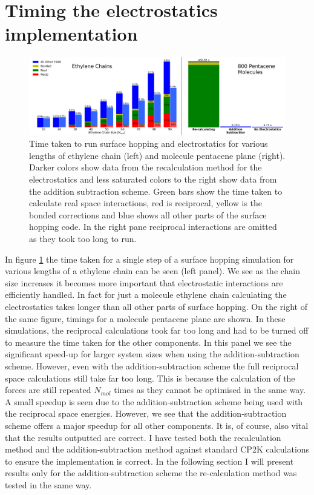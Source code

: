 \section{Timing the electrostatics implementation}
\begin{figure}[ht]
  \includegraphics[width=\textwidth]{../img/ES/TimingsReCalc_vs_AddSub.png}
	\caption{\label{fig:AddSubTimings}Time taken to run surface hopping and electrostatics for various lengths of  ethylene chain (left) and  molecule pentacene plane (right). Darker colors show data from the recalculation method for the electrostatics and less saturated colors to the right show data from the addition subtraction scheme. Green bars show the time taken to calculate real space interactions, red is reciprocal, yellow is the bonded corrections and blue shows all other parts of the surface hopping code. In the right pane reciprocal interactions are omitted as they took too long to run.}
\end{figure}
\noindent In figure \ref{fig:AddSubTimings} the time taken for a single step of a surface hopping simulation for various lengths of a  ethylene chain can be seen (left panel). We see as the chain size increases it becomes more important that electrostatic interactions are efficiently handled. In fact for just a  molecule ethylene chain calculating the electrostatics takes longer than all other parts of surface hopping. On the right of the same figure, timings for a  molecule pentacene plane are shown. In these simulations, the reciprocal calculations took far too long and had to be turned off to measure the time taken for the other components. In this panel we see the significant speed-up for larger system sizes when using the addition-subtraction scheme. However, even with the addition-subtraction scheme the full reciprocal space calculations still take far too long. This is because the calculation of the forces are still repeated $N_{mol}$ times as they cannot be optimised in the same way. A small speedup is seen due to the addition-subtraction scheme being used with the reciprocal space energies. However, we see that the addition-subtraction scheme offers a major speedup for all other components. It is, of course, also vital that the results outputted are correct. I have tested both the recalculation method and the addition-subtraction method against standard CP2K calculations to ensure the implementation is correct. In the following section I will present results only for the addition-subtraction scheme the re-calculation method was tested in the same way.


